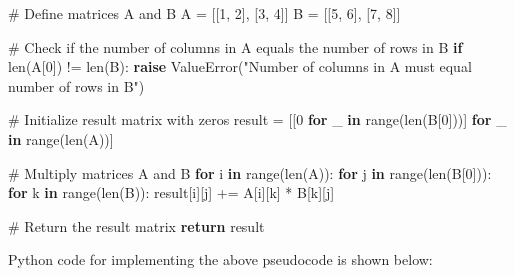 \documentclass[
  letterpaper,
  DIV=11,
  numbers=noendperiod]{scrreprt}
\newenvironment{Shaded}{\begin{snugshade}}{\end{snugshade}}
\newcommand{\BuiltInTok}[1]{\textcolor[rgb]{0.00,0.23,0.31}{#1}}
\newcommand{\CommentTok}[1]{\textcolor[rgb]{0.37,0.37,0.37}{#1}}
\newcommand{\ControlFlowTok}[1]{\textcolor[rgb]{0.00,0.23,0.31}{\textbf{#1}}}
\newcommand{\DecValTok}[1]{\textcolor[rgb]{0.68,0.00,0.00}{#1}}
\newcommand{\KeywordTok}[1]{\textcolor[rgb]{0.00,0.23,0.31}{\textbf{#1}}}
\newcommand{\NormalTok}[1]{\textcolor[rgb]{0.00,0.23,0.31}{#1}}
\newcommand{\OperatorTok}[1]{\textcolor[rgb]{0.37,0.37,0.37}{#1}}
\newcommand{\PreprocessorTok}[1]{\textcolor[rgb]{0.68,0.00,0.00}{#1}}
\newcommand{\StringTok}[1]{\textcolor[rgb]{0.13,0.47,0.30}{#1}}
\theoremstyle{plain}
\theoremstyle{definition}
\theoremstyle{remark}
\begin{document}
\begin{Shaded}
\begin{Highlighting}[]
\CommentTok{\# Define matrices A and B}
\NormalTok{A }\OperatorTok{=}\NormalTok{ [[}\DecValTok{1}\NormalTok{, }\DecValTok{2}\NormalTok{], [}\DecValTok{3}\NormalTok{, }\DecValTok{4}\NormalTok{]]}
\NormalTok{B }\OperatorTok{=}\NormalTok{ [[}\DecValTok{5}\NormalTok{, }\DecValTok{6}\NormalTok{], [}\DecValTok{7}\NormalTok{, }\DecValTok{8}\NormalTok{]]}

\CommentTok{\# Check if the number of columns in A equals the number of rows in B}
\ControlFlowTok{if} \BuiltInTok{len}\NormalTok{(A[}\DecValTok{0}\NormalTok{]) }\OperatorTok{!=} \BuiltInTok{len}\NormalTok{(B):}
    \ControlFlowTok{raise} \PreprocessorTok{ValueError}\NormalTok{(}\StringTok{"Number of columns in A must equal number of rows in B"}\NormalTok{)}

\CommentTok{\# Initialize result matrix with zeros}
\NormalTok{result }\OperatorTok{=}\NormalTok{ [[}\DecValTok{0} \ControlFlowTok{for}\NormalTok{ \_ }\KeywordTok{in} \BuiltInTok{range}\NormalTok{(}\BuiltInTok{len}\NormalTok{(B[}\DecValTok{0}\NormalTok{]))] }\ControlFlowTok{for}\NormalTok{ \_ }\KeywordTok{in} \BuiltInTok{range}\NormalTok{(}\BuiltInTok{len}\NormalTok{(A))]}

\CommentTok{\# Multiply matrices A and B}
\ControlFlowTok{for}\NormalTok{ i }\KeywordTok{in} \BuiltInTok{range}\NormalTok{(}\BuiltInTok{len}\NormalTok{(A)):}
    \ControlFlowTok{for}\NormalTok{ j }\KeywordTok{in} \BuiltInTok{range}\NormalTok{(}\BuiltInTok{len}\NormalTok{(B[}\DecValTok{0}\NormalTok{])):}
        \ControlFlowTok{for}\NormalTok{ k }\KeywordTok{in} \BuiltInTok{range}\NormalTok{(}\BuiltInTok{len}\NormalTok{(B)):}
\NormalTok{            result[i][j] }\OperatorTok{+=}\NormalTok{ A[i][k] }\OperatorTok{*}\NormalTok{ B[k][j]}

\CommentTok{\# Return the result matrix}
\ControlFlowTok{return}\NormalTok{ result}
\end{Highlighting}
\end{Shaded}

Python code for implementing the above pseudocode is shown below:
\end{document}
